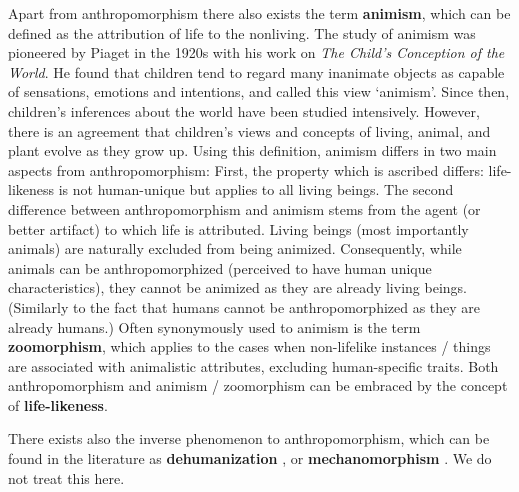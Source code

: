 \documentclass{frontiersSCNS} %
\begin{document}
Apart from anthropomorphism there also exists the term \textbf{animism}, which can be defined as the attribution of life to the nonliving. The study of animism was pioneered by Piaget in the 1920s with his work on \textit{The Child's Conception of the  World}. He found that children tend to regard many inanimate objects as capable of sensations, emotions and intentions, and called this view `animism'. Since then, children's inferences about the world have been studied intensively. However, there is an agreement that children's views and concepts of living, animal, and plant evolve as they grow up. Using this definition, animism differs in two main aspects from anthropomorphism:
First, the property which is ascribed differs: life-likeness is not human-unique but applies to all living beings. The second difference between anthropomorphism and animism stems from the agent (or better artifact) to which life is attributed. Living beings (most importantly animals) are naturally excluded from being animized. Consequently, while animals can be anthropomorphized (perceived to have human unique characteristics), they cannot be animized as they are already living beings. (Similarly to the fact that humans cannot be anthropomorphized as they are already humans.)
Often synonymously used to animism is the term \textbf{zoomorphism}, which applies to the cases when non-lifelike instances / things are associated with animalistic attributes, excluding human-specific traits. Both anthropomorphism and animism / zoomorphism can be embraced by the concept of \textbf{life-likeness}.

There exists also the inverse phenomenon to anthropomorphism, which can be found in the literature as \textbf{dehumanization} \citep{haslam_dehumanization:_2006}, or \textbf{mechanomorphism} \citep{caporael_anthropomorphism_1986}. We do not treat this here.
\end{document}
